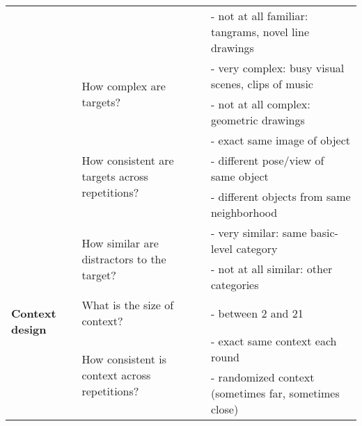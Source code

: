 \documentclass[11pt, floatsintext, jou]{apa6}
\begin{document}
\begin{table*}[h]
{\begin{tabular}{@{}lll@{}}
                                            &                                                                 & - not at all familiar: tangrams, novel line drawings                       \\ \cmidrule(l){2-3} 
                                            & \multirow{2}{*}{How complex are targets?}                       & - very complex: busy visual scenes, clips of music                         \\
                                            &                                                                 & - not at all complex: geometric drawings                                   \\ \cmidrule(l){2-3} 
                                            & \multirow{3}{*}{How consistent are targets across repetitions?} & - exact same image of object                                               \\
                                            &                                                                 & - different pose/view of same object                                       \\
                                            &                                                                 & - different objects from same neighborhood                                 \\ \midrule
\multirow{5}{*}{\textbf{Context design}}    & \multirow{2}{*}{How similar are distractors to the target?}     & - very similar: same basic-level category                                  \\
                                            &                                                                 & - not at all similar: other categories                                     \\ \cmidrule(l){2-3} 
                                            & What is the size of context?                                    & - between 2 and 21                                                         \\ \cmidrule(l){2-3} 
                                            & \multirow{2}{*}{How consistent is context across repetitions?}  & - exact same context each round                                            \\
                                            &                                                                 & - randomized context (sometimes far, sometimes close)                      \\ \midrule

\end{tabular}}
\end{table*}
\end{document}
